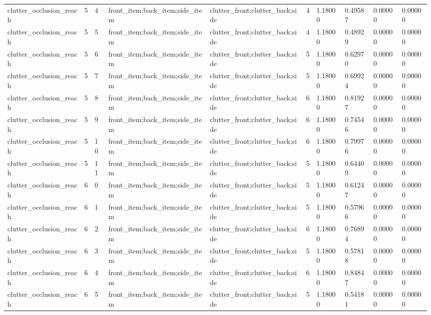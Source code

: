 \documentclass{article}
\begin{document}
\begin{table}[tbp]
{\begin{tabular}{llllllllll}
clutter\_occlusion\_reach & 5 & 4 & front\_item;back\_item;side\_item & clutter\_front;clutter\_back;side & 4 & 1.18000 & 0.49587 & 0.00000 & 0.00000 \\
clutter\_occlusion\_reach & 5 & 5 & front\_item;back\_item;side\_item & clutter\_front;clutter\_back;side & 4 & 1.18000 & 0.48929 & 0.00000 & 0.00000 \\
clutter\_occlusion\_reach & 5 & 6 & front\_item;back\_item;side\_item & clutter\_front;clutter\_back;side & 5 & 1.18000 & 0.62970 & 0.00000 & 0.00000 \\
clutter\_occlusion\_reach & 5 & 7 & front\_item;back\_item;side\_item & clutter\_front;clutter\_back;side & 5 & 1.18000 & 0.69924 & 0.00000 & 0.00000 \\
clutter\_occlusion\_reach & 5 & 8 & front\_item;back\_item;side\_item & clutter\_front;clutter\_back;side & 6 & 1.18000 & 0.81927 & 0.00000 & 0.00000 \\
clutter\_occlusion\_reach & 5 & 9 & front\_item;back\_item;side\_item & clutter\_front;clutter\_back;side & 6 & 1.18000 & 0.74546 & 0.00000 & 0.00000 \\
clutter\_occlusion\_reach & 5 & 10 & front\_item;back\_item;side\_item & clutter\_front;clutter\_back;side & 6 & 1.18000 & 0.79976 & 0.00000 & 0.00000 \\
clutter\_occlusion\_reach & 5 & 11 & front\_item;back\_item;side\_item & clutter\_front;clutter\_back;side & 5 & 1.18000 & 0.64409 & 0.00000 & 0.00000 \\
clutter\_occlusion\_reach & 6 & 0 & front\_item;back\_item;side\_item & clutter\_front;clutter\_back;side & 5 & 1.18000 & 0.61247 & 0.00000 & 0.00000 \\
clutter\_occlusion\_reach & 6 & 1 & front\_item;back\_item;side\_item & clutter\_front;clutter\_back;side & 5 & 1.18000 & 0.57966 & 0.00000 & 0.00000 \\
clutter\_occlusion\_reach & 6 & 2 & front\_item;back\_item;side\_item & clutter\_front;clutter\_back;side & 6 & 1.18000 & 0.76894 & 0.00000 & 0.00000 \\
clutter\_occlusion\_reach & 6 & 3 & front\_item;back\_item;side\_item & clutter\_front;clutter\_back;side & 5 & 1.18000 & 0.57818 & 0.00000 & 0.00000 \\
clutter\_occlusion\_reach & 6 & 4 & front\_item;back\_item;side\_item & clutter\_front;clutter\_back;side & 6 & 1.18000 & 0.84847 & 0.00000 & 0.00000 \\
clutter\_occlusion\_reach & 6 & 5 & front\_item;back\_item;side\_item & clutter\_front;clutter\_back;side & 5 & 1.18000 & 0.54181 & 0.00000 & 0.00000 \\

\end{tabular}}
\end{table}
\end{document}
